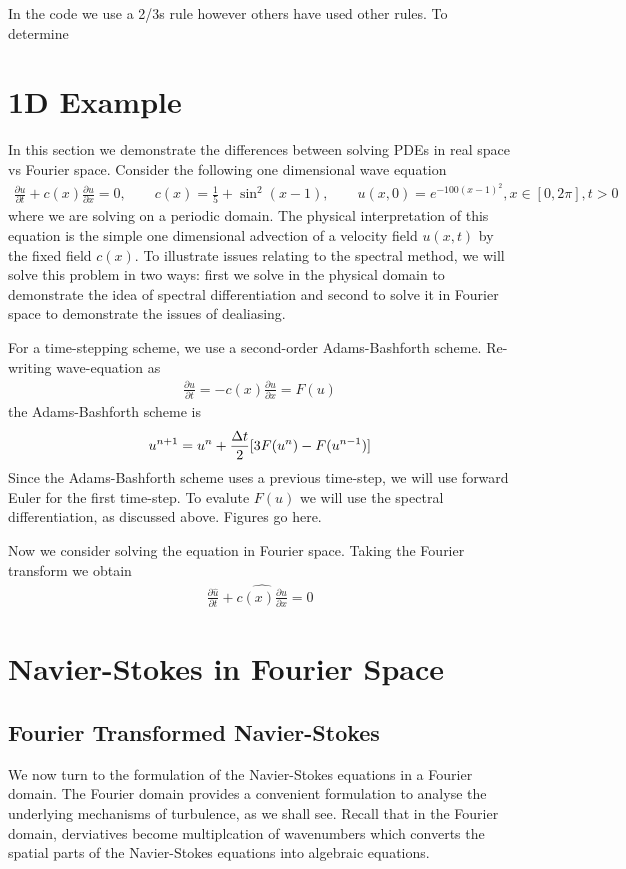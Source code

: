 In the code we use a 2/3s rule however others have used other rules. To determine 

\section{1D Example} 
In this section we demonstrate the differences between solving PDEs in real space vs Fourier space. Consider the following one dimensional wave equation\cite{trefethen_spectral}
\begin{align}
\frac{\partial u}{\partial t} + c(x)\frac{\partial u}{\partial x} = 0,\qquad c(x)=\frac{1}{5}+\sin^{2}(x-1), \qquad u(x,0)=e^{-100(x-1)^{2}}, x\in[0,2\pi], t>0
\end{align}
where we are solving on a periodic domain. The physical interpretation of this equation is the simple one dimensional advection of a velocity field $u(x,t)$ by the fixed field $c(x)$. To illustrate issues relating to the spectral method, we will solve this problem in two ways: first we solve in the physical domain to demonstrate the idea of spectral differentiation and second to solve it in Fourier space to demonstrate the issues of dealiasing.

For a time-stepping scheme, we use a second-order Adams-Bashforth\cite{durran} scheme. Re-writing wave-equation as
\begin{align}
\frac{\partial u}{\partial t} = -c(x)\frac{\partial u}{\partial x} = F(u)
\end{align}
the Adams-Bashforth scheme is
\begin{align}
u^{n+1} = u^{n} + \frac{\Delta t}{2}[3F(u^{n})-F(u^{n-1})]
\end{align}
Since the Adams-Bashforth scheme uses a previous time-step, we will use forward Euler for the first time-step. To evalute $F(u)$ we will use the spectral differentiation, as discussed above. 
Figures go here.

Now we consider solving the equation in Fourier space. Taking the Fourier transform we obtain
\begin{align}
\frac{\partial \hat{u}}{\partial t} + \widehat{c(x)\frac{\partial u}{\partial x}}=0
\end{align}

\section{Navier-Stokes in Fourier Space}
\subsection{Fourier Transformed Navier-Stokes}
We now turn to the formulation of the Navier-Stokes equations in a Fourier domain. The Fourier domain provides a convenient formulation to analyse the underlying mechanisms of turbulence, as we shall see. Recall that in the Fourier domain, derviatives become multiplcation of wavenumbers which converts the spatial parts of the Navier-Stokes equations into algebraic equations. 

